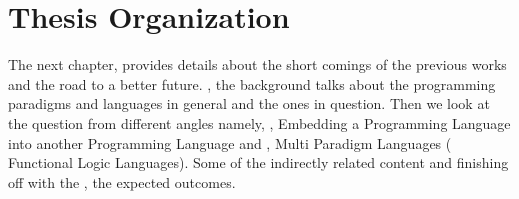 \documentclass[thesis-solanki.tex]{subfiles}
\begin{document}


\section{Thesis Organization}

The next chapter,  provides details about the short comings of the previous works and the road to a 
better future. , the background talks about the programming paradigms and languages in general and 
the ones in question. Then we look at the question from different angles namely, ,  Embedding a 
Programming Language into another Programming Language and  , Multi Paradigm Languages (
Functional Logic Languages). Some of the indirectly related content  and finishing off with the 
, the expected outcomes.     

\end{document}
